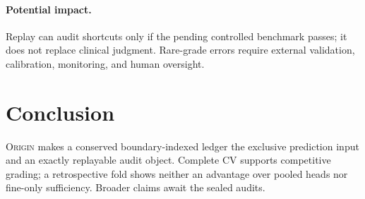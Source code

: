 \documentclass[10pt,twocolumn,letterpaper]{article}
\newcommand{\method}{\textsc{Origin}\xspace}
\begin{document}
\paragraph{Potential impact.}
Replay can audit shortcuts only if the pending controlled benchmark passes; it
does not replace clinical judgment.  Rare-grade errors require external
validation, calibration, monitoring, and human oversight.

\section{Conclusion}
\label{sec:conclusion}

\method makes a conserved boundary-indexed ledger the exclusive prediction
input and an exactly replayable audit object.  Complete CV supports competitive
grading; a retrospective fold shows neither an advantage over pooled heads nor
fine-only sufficiency.  Broader claims await the sealed audits.

{\small
  
  
}
\end{document}
